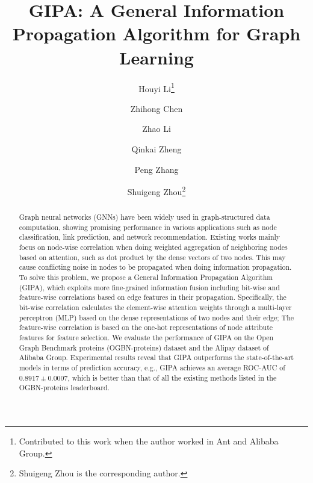 \documentclass[runningheads]{llncs}
\newcommand{\model}{GIPA\xspace}
\begin{document}
\title{GIPA: A General Information Propagation Algorithm for Graph Learning}

\author{
Houyi Li\thanks{Contributed to this work when the author worked in Ant and Alibaba Group.} \and
Zhihong Chen \and
Zhao Li \and
Qinkai Zheng  \and
Peng Zhang \and
Shuigeng Zhou\thanks{Shuigeng Zhou is the corresponding author.}}
\maketitle              \begin{abstract}
Graph neural networks (GNNs) have been widely used in graph-structured data computation, showing promising performance in various applications such as node classification, link prediction, and network recommendation.
Existing works mainly focus on node-wise correlation when doing weighted aggregation of neighboring nodes based on attention, such as dot product by the dense vectors of two nodes. This may cause conflicting noise in nodes to be propagated when doing information propagation. To solve this problem, we propose a General Information Propagation Algorithm (\model), which exploits more fine-grained information fusion including bit-wise and feature-wise correlations based on edge features in their propagation. Specifically, the bit-wise correlation calculates the element-wise attention weights through a multi-layer perceptron (MLP) based on the dense representations of two nodes and their edge; The feature-wise correlation is based on the one-hot representations of node attribute features for feature selection. We evaluate the performance of \model on the Open Graph Benchmark proteins (OGBN-proteins) dataset and the Alipay dataset of Alibaba Group.
Experimental results reveal that \model outperforms the state-of-the-art models in terms of prediction accuracy, e.g., \model achieves an average ROC-AUC of $0.8917\pm 0.0007$, which is better than that of all the existing methods listed in the OGBN-proteins leaderboard.

\end{abstract}
\end{document}
